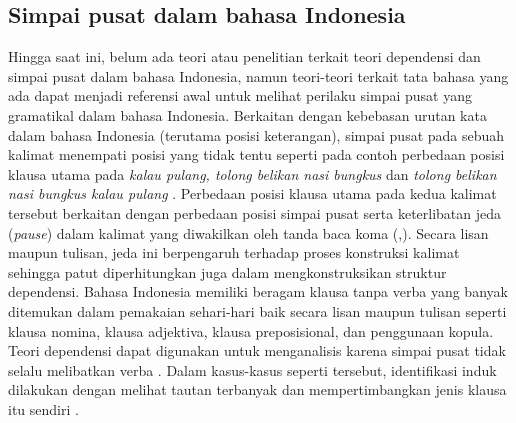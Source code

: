 \subsection{Simpai pusat dalam bahasa Indonesia}
Hingga saat ini, belum ada teori atau penelitian terkait teori dependensi dan simpai pusat dalam bahasa Indonesia, namun teori-teori terkait tata bahasa yang ada dapat menjadi referensi awal untuk melihat perilaku simpai pusat yang gramatikal dalam bahasa Indonesia. Berkaitan dengan kebebasan urutan kata dalam bahasa Indonesia (terutama posisi keterangan), simpai pusat pada sebuah kalimat menempati posisi yang tidak tentu seperti pada contoh perbedaan posisi klausa utama pada  \textit{kalau pulang, tolong belikan nasi bungkus} dan \textit{tolong belikan nasi bungkus kalau pulang} \citep{sneddon2010indonesian}. Perbedaan posisi klausa utama pada kedua kalimat tersebut berkaitan dengan perbedaan posisi simpai pusat serta keterlibatan jeda (\textit{pause}) dalam kalimat yang diwakilkan oleh tanda baca koma (,). Secara lisan maupun tulisan, jeda ini berpengaruh terhadap proses konstruksi kalimat sehingga patut diperhitungkan juga dalam mengkonstruksikan struktur dependensi. 
Bahasa Indonesia memiliki beragam klausa tanpa verba yang banyak ditemukan dalam pemakaian sehari-hari baik secara lisan maupun tulisan \citep{sneddon2010indonesian} seperti klausa nomina, klausa adjektiva, klausa preposisional, dan penggunaan kopula. Teori dependensi dapat digunakan untuk menganalisis karena simpai pusat tidak selalu melibatkan verba \citep{tesniere1959elements}. Dalam kasus-kasus seperti tersebut, identifikasi induk dilakukan dengan melihat tautan terbanyak \citep{tesniere1959elements} dan mempertimbangkan jenis klausa itu sendiri \citep{sneddon2010indonesian}.